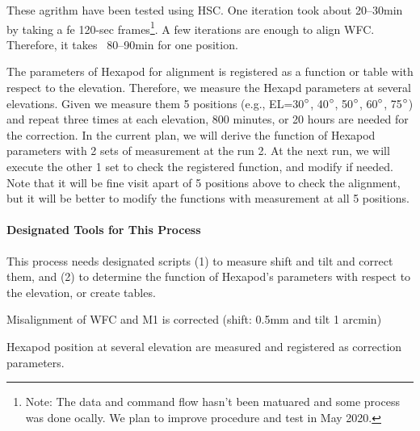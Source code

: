 These agrithm have been tested using HSC.
One iteration took about 20--30min by taking a fe 120-sec frames\footnote{Note: The data and command flow hasn't been matuared and some process was done ocally. We plan to improve procedure and test in May 2020.}.
A few iterations are enough to align WFC.
Therefore, it takes ~80--90min for one position.

The parameters of Hexapod for alignment is registered as a function or table with respect to the elevation.
Therefore, we measure the Hexapd parameters at several elevations.
Given we measure them 5 positions (e.g., EL=30$^\circ$, 40$^\circ$, 50$^\circ$, 60$^\circ$, 75$^\circ$) and repeat three times at each elevation, 800 minutes, or 20 hours are needed for the correction.
In the current plan, we will derive the function of Hexapod parameters with 2 sets of measurement at the run 2.
At the next run, we will execute the other 1 set to check the registered function, and modify if needed.
Note that it will be fine visit apart of 5 positions above to check the alignment, but it will be better to modify the functions with measurement at all 5 positions.


\smallskip
\paragraph{Designated Tools for This Process}
This process needs designated scripts
(1) to measure shift and tilt and correct them, and
(2) to determine the function of Hexapod's parameters with respect to the elevation, or create tables. 


\begin{itembox}[l]{}
Misalignment of  WFC and M1 is corrected (shift: 0.5mm and tilt 1 arcmin)

Hexapod position at several elevation are measured and registered as correction parameters.

\end{itembox}
